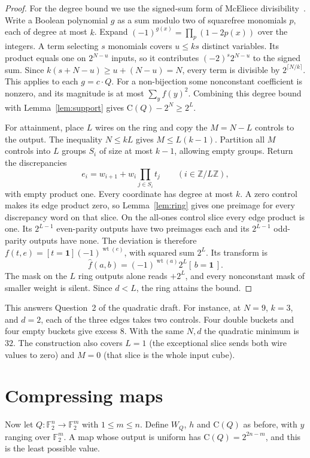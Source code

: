 \documentclass[11pt]{article}
\theoremstyle{definition}
\theoremstyle{remark}
\newcommand{\F}{\mathbb{F}_2}
\newcommand{\wt}{\operatorname{wt}}
\newcommand{\W}{W}
\newcommand{\Coll}{\mathrm{C}}
\newcommand{\one}{\mathbf{1}}
\begin{document}
\begin{proof}
For the degree bound we use the signed-sum form of McEliece
divisibility~\cite{McEliece72}. Write a Boolean polynomial $g$ as a sum
modulo two of squarefree monomials $p$, each of degree at most $k$. Expand
$(-1)^{g(x)}=\prod_p(1-2p(x))$ over the integers. A term selecting $s$
monomials covers $u\le ks$ distinct variables. Its product equals one on
$2^{N-u}$ inputs, so it contributes $(-2)^s2^{N-u}$ to the signed sum.
Since $k(s+N-u)\ge u+(N-u)=N$, every term is divisible by
$2^{\lceil N/k\rceil}$. This applies to each $g=c\cdot Q$.
For a non-bijection some nonconstant coefficient is nonzero, and its
magnitude is at most $\sum_y f(y)^2$. Combining this degree bound with
Lemma~\ref{lem:support} gives $\Coll(Q)-2^N\ge2^L$.

For attainment, place $L$ wires on the ring and copy the $M=N-L$ controls
to the output. The inequality $N\le kL$ gives $M\le L(k-1)$. Partition
all $M$ controls into $L$ groups $S_i$ of size at most $k-1$, allowing
empty groups. Return the discrepancies
\[
  e_i=w_{i+1}+w_i\prod_{j\in S_i}t_j
  \qquad (i\in\mathbb Z/L\mathbb Z),
\]
with empty product one. Every coordinate has degree at most $k$. A zero
control makes its edge product zero, so Lemma~\ref{lem:ring} gives one
preimage for every discrepancy word on that slice. On the all-ones control
slice every edge product is one. Its $2^{L-1}$ even-parity outputs have two
preimages each and its $2^{L-1}$ odd-parity outputs have none. The deviation
is therefore $f(t,e)=[t=\one](-1)^{\wt(e)}$, with squared sum $2^L$.
Its transform is
\[
  \hat f(a,b)=(-1)^{\wt(a)}2^L[\,b=\one\,].
\]
The mask on the $L$ ring outputs alone reads $+2^L$, and every nonconstant
mask of smaller weight is silent. Since $d<L$, the ring attains the bound.
\end{proof}

This answers Question~2 of the quadratic draft. For instance, at $N=9$,
$k=3$, and $d=2$, each of the three edges takes two controls. Four double
buckets and four empty buckets give excess $8$. With the same $N,d$ the
quadratic minimum is $32$. The construction also covers $L=1$ (the
exceptional slice sends both wire values to zero) and $M=0$ (that slice
is the whole input cube).

\section{Compressing maps}\label{sec:rect}

Now let $Q\colon\F^n\to\F^m$ with $1\le m\le n$. Define $\W_Q$, $h$ and
$\Coll(Q)$ as before, with $y$ ranging over $\F^m$. A map whose output is
uniform has $\Coll(Q)=2^{2n-m}$, and this is the least possible value.
\end{document}
